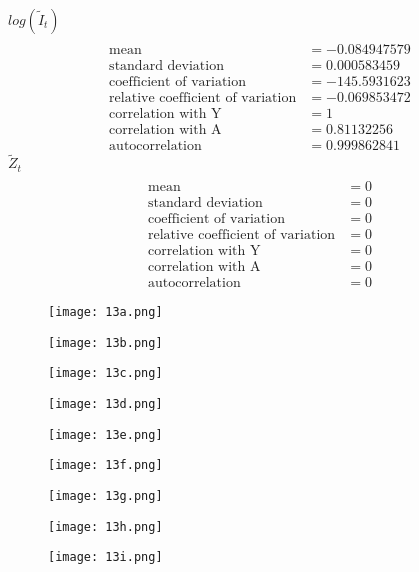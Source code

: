 \documentclass[letterpaper,12pt]{article}
\theoremstyle{definition}
\begin{document}
$log(\tilde{I}_t)$
\begin{align*}
\\\text{mean} &= -0.084947579	
\\\text{standard deviation} &= 	0.000583459
\\\text{coefficient of variation}&=-145.5931623
\\\text{relative coefficient of variation}&=-0.069853472
\\\text{correlation with Y}&=1
\\\text{correlation with A}&=0.81132256
\\\text{autocorrelation}&=0.999862841
\end{align*}
$\tilde{Z}_t$
\begin{align*}
\\\text{mean} &= 0
\\\text{standard deviation} &= 0
\\\text{coefficient of variation}&=0
\\\text{relative coefficient of variation}&=0
\\\text{correlation with Y}&=0
\\\text{correlation with A}&=0
\\\text{autocorrelation}&=0
\end{align*}

\begin{figure}[H]
\texttt{[image: 13a.png]}
\end{figure}
\begin{figure}[H]
\texttt{[image: 13b.png]}
\end{figure}
\begin{figure}[H]
\texttt{[image: 13c.png]}
\end{figure}
\begin{figure}[H]
\texttt{[image: 13d.png]}
\end{figure}
\begin{figure}[H]
\texttt{[image: 13e.png]}
\end{figure}
\begin{figure}[H]
\texttt{[image: 13f.png]}
\end{figure}
\begin{figure}[H]
\texttt{[image: 13g.png]}
\end{figure}
\begin{figure}[H]
\texttt{[image: 13h.png]}
\end{figure}
\begin{figure}[H]
\texttt{[image: 13i.png]}
\end{figure}
\end{document}
